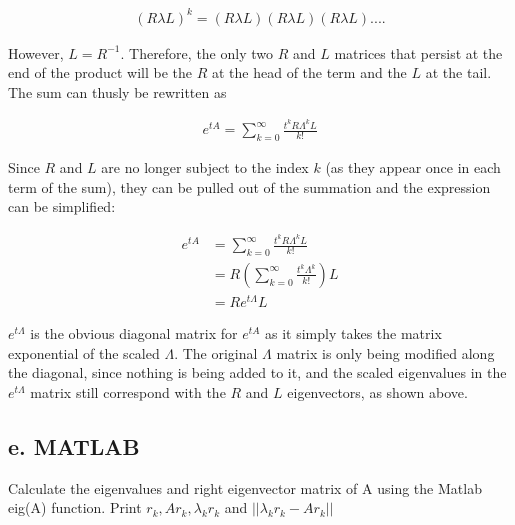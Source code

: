 \documentclass{article}
\begin{document}
		\begin{align*}
			(R\lambda L)^{k}=(R\lambda L)(R\lambda L)(R\lambda L)....
		\end{align*}
		
		However, $L=R^{-1}$.  Therefore, the only two $R$ and $L$ matrices that persist at the end of the product will be the $R$ at the head of the term and the $L$ at the tail.  The sum can thusly be rewritten as
		
		\begin{align*}
			e^{tA}=\sum_{k=0}^{\infty}\frac{t^{k}R\Lambda^{k}L}{k!}
		\end{align*}
		
		Since $R$ and $L$ are no longer subject to the index $k$ (as they appear once in each term of the sum), they can be pulled out of the summation and the expression can be simplified:
		
		\begin{align*}
			e^{tA}&=\sum_{k=0}^{\infty}\frac{t^{k}R\Lambda^{k}L}{k!}\\
			&=R(\sum_{k=0}^{\infty}\frac{t^{k}\Lambda^{k}}{k!})L\\
			&=Re^{t\Lambda}L
		\end{align*}
		
		$e^{t\Lambda}$ is the obvious diagonal matrix for $e^{tA}$ as it simply takes the matrix exponential of the scaled $\Lambda$.  The original $\Lambda$ matrix is only being modified along the diagonal, since nothing is being added to it, and the scaled eigenvalues in the $e^{t\Lambda}$ matrix still correspond with the $R$ and $L$ eigenvectors, as shown above.
		
		\newpage
		\subsection{e. MATLAB}
		Calculate the eigenvalues and right eigenvector matrix of A using the Matlab eig(A) function.  Print $r_{k},Ar_{k},\lambda_{k}r_{k}$ and $||\lambda_{k}r_{k}-Ar_{k}||$  
\end{document}
